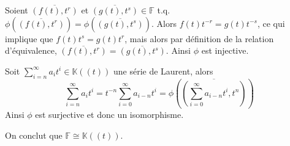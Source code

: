 \documentclass[french]{article}
\newcommand{\K}{\mathbb{K}}
\newcommand{\F}{\mathbb{F}}
\newcommand{\ol}{\overline}
\begin{document}
Soient $\ol{(f(t), t^r)}$ et $\ol{(g(t), t^s)} \in \F$ t.q. 
$\phi(\ol{(f(t), t^r)}) = \phi(\ol{(g(t), t^s)})$. Alors
$f(t)t^{-r} = g(t)t^{-s}$, ce qui implique que $f(t)t^s = g(t)t^r$, mais alors
par définition de la relation d'équivalence,
$\ol{(f(t), t^r)} = \ol{(g(t), t^s)}$. Ainsi $\phi$ est injective.

Soit $\sum_{i = n}^\infty a_i t^i \in \K((t))$ une série de Laurent, alors
\begin{equation*}
\sum_{i = n}^\infty a_i t^i = t^{-n}\sum_{i = 0}^\infty a_{i - n} t^i
= \phi(\ol{(\sum_{i=0}^\infty a_{i-n}t^i, t^n)})
\end{equation*}
Ainsi $\phi$ est surjective et donc un isomorphisme.

On conclut que $\F \cong \K((t))$.
\end{document}
